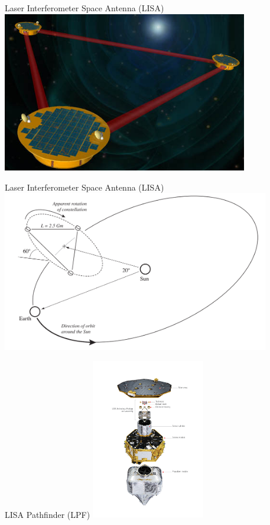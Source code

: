 \documentclass[aspectratio=169,xcolor=dvipsnames]{beamer}
\begin{document}
\begin{frame}{Laser Interferometer Space Antenna (LISA)}
    \centering
    \includegraphics[height=7cm]{LISA.jpg}\\
\end{frame}
\begin{frame}{Laser Interferometer Space Antenna (LISA)}
    \centering
    \includegraphics[height=7cm]{figure 1.png}\\
 \end{frame}
\begin{frame}{LISA Pathfinder (LPF)}
    \centering
    \includegraphics[height=7cm]{LPF.jpg}\\
\end{frame}
\end{document}
